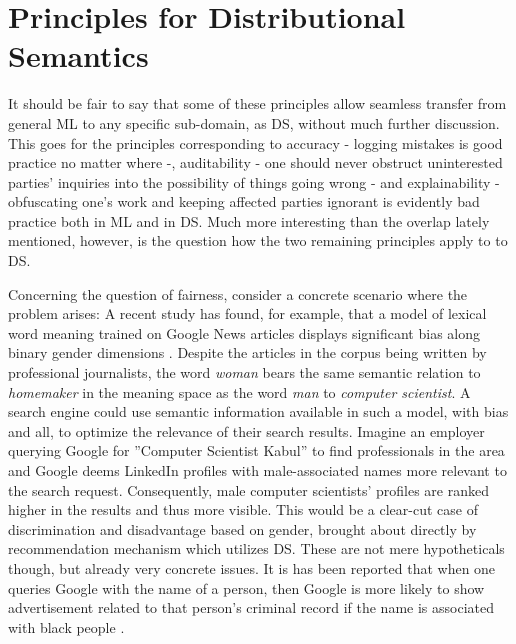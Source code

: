\documentclass{article}
\begin{document}
\section{Principles for Distributional Semantics}\hypertarget{sec4}{}
It should be fair to say that some of these principles allow seamless transfer from general ML to any specific sub-domain, as DS, without much further discussion.
This goes for the principles corresponding to accuracy - logging mistakes is good practice no matter where -, auditability - one should never obstruct uninterested parties' inquiries into the possibility of things going wrong - and explainability - obfuscating one's work and keeping affected parties ignorant is evidently bad practice both in ML and in DS.
Much more interesting than the overlap lately mentioned, however, is the question how the two remaining principles apply to to DS.

Concerning the question of fairness, consider a concrete scenario where the problem arises: A recent study has found, for example, that a model of lexical word meaning trained on Google News articles displays significant bias along binary gender dimensions \cite{bolukbasi2016man}. Despite the articles in the corpus being written by professional journalists, the word \emph{woman} bears the same semantic relation to \emph{homemaker} in the meaning space as the word \emph{man} to \emph{computer scientist}. A search engine could use semantic information available in such a model, with bias and all, to optimize the relevance of their search results. Imagine an employer querying Google for ''Computer Scientist Kabul'' to find professionals in the area and Google deems LinkedIn profiles with male-associated names more relevant to the search request. Consequently, male computer scientists' profiles are ranked higher in the results and thus more visible. This would be a clear-cut case of discrimination and disadvantage based on gender, brought about directly by recommendation mechanism which utilizes DS. These are not mere hypotheticals though, but already very concrete issues. It is has been reported that when one queries Google with the name of a person, then Google is more likely to show advertisement related to that person's criminal record if the name is associated with black people \cite{sweeney2013discrimination}.
\end{document}
